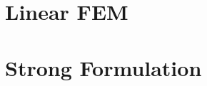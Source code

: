 \documentclass[en]{minipw} %
\begin{document}
\section{Linear FEM}
\section{Strong Formulation}



\begin{thebibliography}{20}%

\end{thebibliography}











\end{document}
